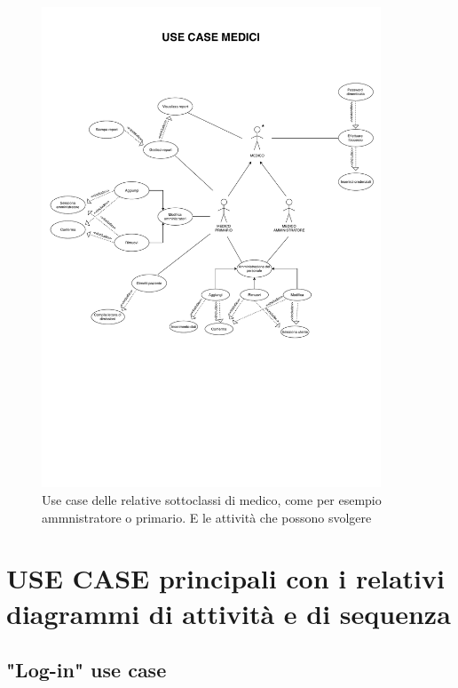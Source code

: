 \documentclass{article}
\begin{document}
	\begin{figure}[H]

		\includegraphics[width=0.9\textwidth]{documenti/useCase_medici.pdf}
		\caption{Use case delle relative sottoclassi di medico, come per esempio ammnistratore o primario.  E le attività che possono svolgere}
		\label{usecase_medici}

	\end{figure}

	\vspace{0.5cm}


\newpage




\section{USE CASE principali con i relativi diagrammi di attività e di sequenza}

\subsection{"Log-in" use case}
\end{document}
